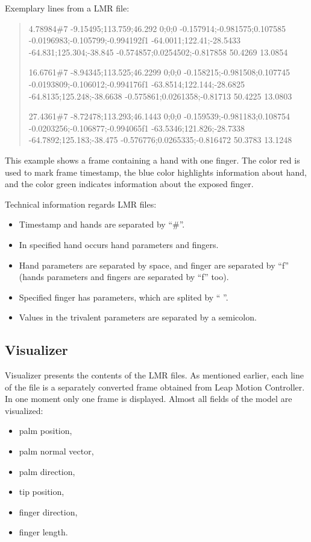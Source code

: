 Exemplary lines from a LMR file:
\begin{quote}
{\color{red}4.78984}\#{\color{blue}7 -9.15495;113.759;46.292 0;0;0 -0.157914;-0.981575;0.107585 -0.0196983;-0.105799;-0.994192}f1 {\color{green} -64.0011;122.41;-28.5433 -64.831;125.304;-38.845 -0.574857;0.0254502;-0.817858 50.4269 13.0854}

{\color{red}16.6761}\#{\color{blue}7 -8.94345;113.525;46.2299 0;0;0 -0.158215;-0.981508;0.107745 -0.0193809;-0.106012;-0.994176}f1 {\color{green} -63.8514;122.144;-28.6825 -64.8135;125.248;-38.6638 -0.575861;0.0261358;-0.81713 50.4225 13.0803}

{\color{red}27.4361}\#{\color{blue}7 -8.72478;113.293;46.1443 0;0;0 -0.159539;-0.981183;0.108754 -0.0203256;-0.106877;-0.994065}f1 {\color{green} -63.5346;121.826;-28.7338 -64.7892;125.183;-38.475 -0.576776;0.0265335;-0.816472 50.3783 13.1248}
\end{quote}

This example shows a frame containing a hand with one finger. The color red is used to mark frame timestamp, the blue color 
highlights information about hand, and the color green indicates information about the exposed finger.


Technical information regards LMR files:
\begin{itemize}
\item Timestamp and hands are separated by ``\#''. 
\item In specified hand occurs hand parameters and fingers. 
\item Hand parameters are separated by space, and finger are separated by ``f'' (hands parameters and fingers are separated by ``f'' too). 
\item Specified finger has parameters, which are splited by `` ''. 
\item Values in the trivalent parameters are separated by a semicolon.
\end{itemize}

\subsection{Visualizer}
Visualizer presents the contents of the LMR files. As mentioned earlier, each line of the file is a separately converted frame obtained from Leap Motion Controller. In one moment only one frame is displayed.
Almost all fields of the model are visualized:
\begin{itemize}
\item palm position,
\item palm normal vector,
\item palm direction,
\item tip position,
\item finger direction,
\item finger length.
\end{itemize}

